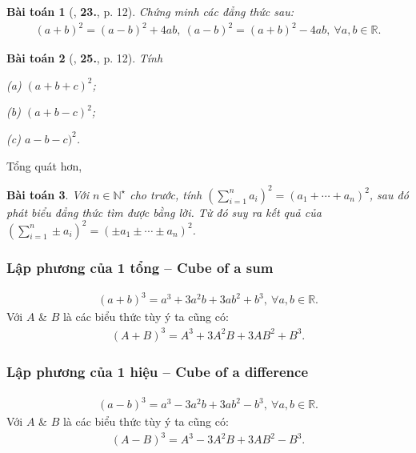 \documentclass{article}
\numberwithin{equation}{section}
\newtheorem{baitoan}{Bài toán}[section]
\begin{document}
\begin{baitoan}[\cite{SGK_Toan_8_tap_1}, \textbf{23.}, p. 12]
	Chứng minh các đẳng thức sau:
	\begin{align*}
		(a + b)^2 = (a - b)^2 + 4ab,\ (a - b)^2 = (a + b)^2 - 4ab,\ \forall a,b\in\mathbb{R}.
	\end{align*}
\end{baitoan}

\begin{baitoan}[\cite{SGK_Toan_8_tap_1}, \textbf{25.}, p. 12]
	Tính
	\begin{enumerate*}
		\item[(a)] $(a + b + c)^2$;
		\item[(b)] $(a + b - c)^2$;
		\item[(c)] $a - b - c)^2$.
	\end{enumerate*}
\end{baitoan}
Tổng quát hơn,
\begin{baitoan}
	Với $n\in\mathbb{N}^\star$ cho trước, tính $\left(\sum_{i=1}^n a_i\right)^2 = (a_1 + \cdots + a_n)^2$, sau đó phát biểu đẳng thức tìm được bằng lời. Từ đó suy ra kết quả của $\left(\sum_{i=1}^n \pm a_i\right)^2 = (\pm a_1\pm\cdots\pm a_n)^2$.
\end{baitoan}

\subsubsection{Lập phương của 1 tổng -- Cube of a sum}
\begin{align}
	\label{cube of a sum}
	(a + b)^3 = a^3 + 3a^2b + 3ab^2 + b^3,\ \forall a,b\in\mathbb{R}.
\end{align}
Với $A$ \& $B$ là các biểu thức tùy ý ta cũng có:
\begin{align*}
	(A + B)^3 = A^3 + 3A^2B + 3AB^2 + B^3.
\end{align*}

\subsubsection{Lập phương của 1 hiệu -- Cube of a difference}
\begin{align}
	\label{cube of a difference}
	(a - b)^3 = a^3 - 3a^2b + 3ab^2 - b^3,\ \forall a,b\in\mathbb{R}.
\end{align}
Với $A$ \& $B$ là các biểu thức tùy ý ta cũng có:
\begin{align*}
	(A - B)^3 = A^3 - 3A^2B + 3AB^2 - B^3.
\end{align*}
\end{document}
